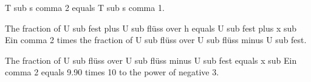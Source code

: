 T sub s comma 2 equals T sub s comma 1.

The fraction of U sub fest plus U sub flüss over h equals U sub fest plus x sub Ein comma 2 times the fraction of U sub flüss over U sub flüss minus U sub fest.

The fraction of U sub flüss over U sub flüss minus U sub fest equals x sub Ein comma 2 equals 9.90 times 10 to the power of negative 3.